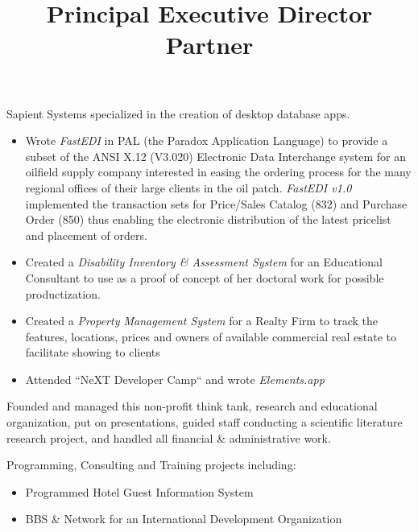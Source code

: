 \begin{resume}
\title{ Principal }
\begin{position}
Sapient Systems specialized in the creation of desktop database apps.
\begin{itemize}
\item Wrote {\it FastEDI} in PAL (the Paradox Application Language)  to 
	provide a subset of the 
	ANSI X.12 (V3.020) Electronic Data Interchange system for an 
	oilfield supply company interested in easing the ordering process for
	the many regional offices of their large clients in the oil patch.  
	{\it FastEDI v1.0} implemented 
	the transaction sets for Price/Sales Catalog (832) and
	Purchase Order (850) thus enabling the electronic distribution 
	of the latest pricelist and placement of orders.
\item Created a {\it Disability Inventory \& Assessment System }
	for an Educational Consultant to use as a proof of concept of
	her doctoral work for possible productization.
\item Created a {\it Property Management System} for a Realty Firm to
	track the features, locations, prices and owners of 
	available commercial real estate to facilitate showing to clients
\item Attended ``NeXT Developer Camp`` and wrote \emph{Elements.app}
\end{itemize}
\end{position}


\title{ Executive Director }
\begin{position}
Founded and managed this non-profit think tank, research and educational 
organization, put on presentations, guided staff conducting a scientific 
literature research project, and handled all financial \& administrative work.
\end{position}



\title{ Partner }
\begin{position}
Programming, Consulting and Training projects including:
\begin{itemize}
\item Programmed Hotel Guest Information System
\item BBS \& Network for an International Development Organization
\end{itemize}

\end{position}



\end{resume}
